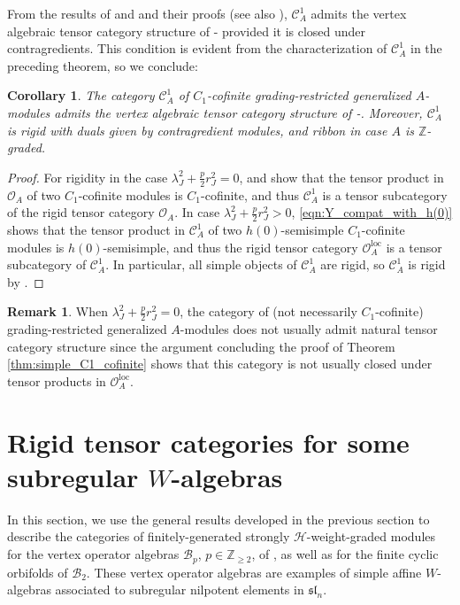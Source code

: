 \documentclass[11pt, reqno]{amsart}
\newtheorem{cor}[thm]{Corollary}
\theoremstyle{definition}\newtheorem{defi}[thm]{Definition}
\theoremstyle{definition}\newtheorem{rem}[thm]{Remark}
\theoremstyle{definition}\newtheorem{exam}[thm]{Example}
\theoremstyle{definition}\newtheorem{assum}[thm]{Assumption}
\newcommand{\cB}{\mathcal{B}}
\newcommand{\cH}{\mathcal{H}}
\newcommand{\cO}{\mathcal{O}}
\newcommand{\cC}{\mathcal{C}}
\newcommand{\ZZ}{\mathbb{Z}}
\newcommand{\Oloc}{\cO^{\mathrm{loc}}}
\begin{document}
From the results of \cite[Section 4]{CJORY} and \cite[Section 3]{CY} and their proofs (see also \cite[Theorem 2.3]{McR-cosets}), $\cC_A^1$ admits the vertex algebraic tensor category structure of \cite{HLZ1}-\cite{HLZ8} provided it is closed under contragredients. This condition is evident from the characterization of $\cC_A^1$ in the preceding theorem, so we conclude:
\begin{cor}\label{cor:C1_cofin}
The category $\cC_A^1$ of $C_1$-cofinite grading-restricted generalized $A$-modules admits the vertex algebraic tensor category structure of \cite{HLZ1}-\cite{HLZ8}. Moreover, $\cC_A^1$ is rigid with duals given by contragredient modules, and ribbon in case $A$ is $\ZZ$-graded.
\end{cor}
\begin{proof}
For rigidity in the case $\lambda_J^2+\frac{p}{2}r_J^2=0$, \cite[Key Theorem]{Miy} and \cite[Corollary 2.12]{CMY-completions} show that the tensor product in $\cO_A$ of two $C_1$-cofinite modules is $C_1$-cofinite, and thus $\cC_A^1$ is a tensor subcategory of the rigid tensor category $\cO_A$. In case $\lambda_J^2+\frac{p}{2}r_J^2>0$, \eqref{eqn:Y_compat_with_h(0)} shows that the tensor product in $\cC_A^1$ of two $h(0)$-semisimple $C_1$-cofinite modules is $h(0)$-semisimple, and thus the rigid tensor category $\Oloc_A$ is a tensor subcategory of $\cC_A^1$. In particular, all simple objects of $\cC_A^1$ are rigid, so $\cC_A^1$ is rigid by \cite[Theorem 4.4.1]{CMY-singlet}.
\end{proof}

\begin{rem}
When $\lambda_J^2+\frac{p}{2}r_J^2=0$, the category of (not necessarily $C_1$-cofinite) grading-restricted generalized $A$-modules does not usually admit natural tensor category structure since the argument concluding the proof of Theorem \ref{thm:simple_C1_cofinite} shows that this category is not usually closed under tensor products in $\Oloc_A$.
\end{rem}

\section{Rigid tensor categories for some subregular \texorpdfstring{$W$}{W}-algebras}\label{subregular}


In this section, we use the general results developed in the previous section to describe the categories of finitely-generated strongly $\cH$-weight-graded modules for the vertex operator algebras $\cB_p$, $p\in\ZZ_{\geq 2}$, of \cite{CRW}, as well as for the finite cyclic orbifolds of $\cB_2$. These vertex operator algebras are examples of simple affine $W$-algebras associated to subregular nilpotent elements in $\mathfrak{sl}_n$.
\end{document}
